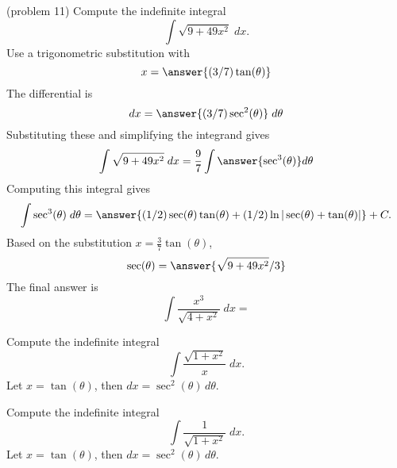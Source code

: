 \documentclass{ximera}
\begin{document}
\begin{problem}(problem 11)
Compute the indefinite integral
\[
\int \sqrt{9 + 49x^2} \; dx.
\]
Use a trigonometric substitution with\\
\[
x = \answer{(3/7)\tan(\theta)}
\]
The differential is\\
\[
dx = \answer{(3/7)\sec^2(\theta)} \; d\theta
\]
Substituting these and simplifying the integrand gives\\
\[
\int \sqrt{9 + 49x^2} \; dx = \frac97 \int \answer{\sec^3(\theta)} d\theta
\]
Computing this integral gives
\[
\int \sec^3(\theta) \; d\theta = \answer{(1/2)\sec(\theta) \tan(\theta) + (1/2)\ln|\sec(\theta)+\tan(\theta)|} + C.
\]
Based on the substitution $x = \frac37 \tan(\theta)$, \\
\[
\sec(\theta) = \answer{\sqrt{9+49x^2}/3}
\]
The final answer is
\[
\int  \frac{x^3}{\sqrt{4 + x^2}} \; dx = 
\]
\begin{center}
\begin{multipleChoice}
\end{multipleChoice}
\end{center}
\end{problem}






\begin{example}[example 12]
Compute the indefinite integral
\[
\int\frac{\sqrt{1+x^2}}{x}\; dx.
\]
Let $x = \tan(\theta)$, then $dx = \sec^2(\theta) \, d\theta$.
\end{example}

\begin{example}
Compute the indefinite integral
\[
\int\frac{1}{\sqrt{1+x^2}}\; dx.
\]
Let $x = \tan(\theta)$, then $dx = \sec^2(\theta) \, d\theta$.
\end{example}





\begin{center}
\begin{foldable}
\end{foldable}
\end{center}
\end{document}
